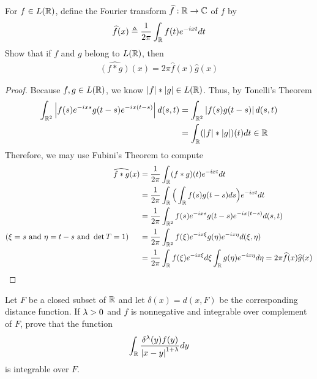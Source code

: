 \documentclass{report}
\begin{document}
\begin{question}{}{}
For $f\in L(\mathbb{R})$, define the Fourier transform $\widehat{f}:\mathbb{R} \rightarrow \mathbb{C} $ of $f$ by 
 \begin{align*}
\widehat{f}(x)\triangleq  \frac{1}{2\pi  }\int_{\mathbb{R}} f(t)e^{- ixt}dt 
\end{align*}
Show that if $f$ and  $g$ belong to $L(\mathbb{R})$, then 
\begin{align*}
  \widehat{(f * g)}(x)=2 \pi  \widehat{f}(x)\widehat{g}(x) 
\end{align*}
\end{question}
\begin{proof}
Because $f,g\in L(\mathbb{R})$, we know $\left|f\right|* \left|g\right|\in L(\mathbb{R})$. Thus, by Tonelli's Theorem 
\begin{align*}
  \int_{\mathbb{R}^2}\left|f(s)e^{-ix s}g(t-s)e^{-ix (t-s)}\right|d(s,t)&= \int_{\mathbb{R}^2} \left|f(s)g(t-s)\right|d(s,t) \\
  &=\int_{\mathbb{R}} (\left|f\right| * \left|g\right|)(t) dt  \in\mathbb{R}
\end{align*}
Therefore, we may use Fubini's Theorem to compute 
\begin{align*}
\widehat{f*g}(x)&= \frac{1}{2\pi }\int_{\mathbb{R}} (f*g)(t)e^{- i xt}dt  \\
&=\frac{1}{2\pi }\int_{\mathbb{R}} \Big(\int_{\mathbb{R}} f(s)g(t-s)ds\Big)e^{- ix t}dt \\
&=\frac{1}{2\pi }\int_{\mathbb{R}^2} f(s)e^{- ixs} g(t-s)e^{- ix (t-s)}d(s,t) \\
(\xi=s \text{ and } \eta= t-s\text{ and }\operatorname{det}T=1 )\hspace{0.5cm}&=\frac{1}{2\pi }\int_{\mathbb{R}^2} f(\xi)e^{- ix \xi}g(\eta )e^{- ix \eta }d(\xi,\eta ) \\
&= \frac{1}{2\pi }\int_{\mathbb{R}} f(\xi) e^{- i x \xi} d\xi \int_{\mathbb{R}} g(\eta )e^{ - ix \eta }d\eta =2\pi \widehat{f}(x)\widehat{g}(x) 
\end{align*}
\end{proof}
\begin{question}{}{}
Let $F$ be a closed subset of $\mathbb{R}$ and let  $\delta (x)=d(x,F) $ be the corresponding distance function. If $\lambda >0$ and $f$ is nonnegative and integrable over complement of $F$, prove that the function 
 \begin{align*}
\int_{\mathbb{R}} \frac{\delta ^{\lambda }(y)f(y)}{\left|x-y\right|^{1+ \lambda }}dy
\end{align*}
is integrable over $F$. 
\end{question}
\end{document}
